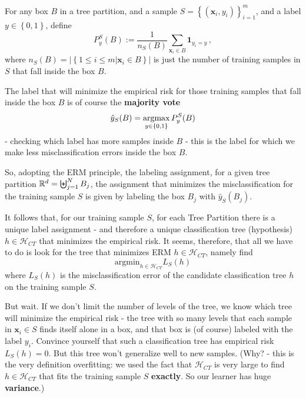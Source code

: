 \documentclass[11pt]{article}
\newcommand{\Hc}{\mathcal{H}}
\newcommand{\VV}[1]{\mathbf{#1}}
\begin{document}
 For any box $B$ in a tree partition, and a sample $S=\left\{ (\VV{x}_i,y_i)
 \right\}_{i=1}^m$, and a label $y\in\left\{ 0,1 \right\}$, define
\[
  P^S_y(B) := \frac{1}{n_S(B)}\sum_{ \VV{x}_i \in B
  }\mathbf{1}_{y_i=y}\,,
\]
where $n_S(B) = \big|  \left\{ 1\leq i \leq m| \VV{x}_i\in B \right\}\big|$ is
just the number of training samples in $S$ that fall inside the box $B$. 

 The label that will
 minimize the empirical risk for those training samples that fall inside the box
 $B$ is of course the {\bf majority vote} 
 \[\hat{y}_S(B) = \operatorname*{argmax}_{y\in\left\{ 0,1
 \right\}} P^S_y(B)\]
 - checking which label has more samples inside $B$ - this
 is
 the label for which we make less misclassification errors inside the box $B$.


 So, adopting the ERM principle, the labeling assignment, for a given tree
 partition $\mathbb{R}^d=\biguplus_{j=1}^N B_j$, the assignment that minimizes the
 misclassification for the training sample $S$ is given by labeling the box $B_j$
 with $\hat{y}_S(B_j)$.
 
 It follows that, for our training sample $S$, 
 for each Tree Partition there is a unique label assignment - and therefore a
 unique classification tree (hypothesis) $h\in\Hc_{CT}$ that minimizes the
 empirical risk. It seems, therefore, that all we have to do is look for the
 tree that minimizes ERM $h\in\Hc_{CT}$, namely find 
 \[
   \text{argmin}_{h\in\Hc_{CT}} L_S(h)
 \]
 where $L_S(h)$ is the misclassification error of the candidate classification
 tree $h$ on the training sample $S$.

 But wait. If we don't limit the number of levels of the tree, we know which
 tree will minimize the empirical risk - the tree with so many levels that each
 sample in $\VV{x}_i\in S$ finds itself alone in a box, and that box is (of course) labeled
 with the label $y_i$. Convince yourself that such a classification tree has
 empirical risk $L_S(h)=0$. But this tree won't generalize well to new samples.
 (Why? - this is the very definition overfitting: we used the fact that
   $\Hc_{CT}$ is very large to find $h\in\Hc_{CT}$ that fits the training sample
 $S$ {\bf exactly}. So our learner has huge {\bf variance}.)
\end{document}
